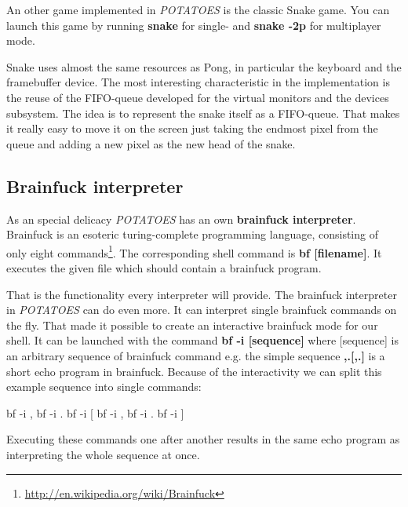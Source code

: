 \documentclass[11pt,a4paper]{scrartcl}
\makeatletter
\renewcommand*{\lstlistoflistings}{%
  \begingroup
    \if@twocolumn
      \@restonecoltrue\onecolumn
    \else
      \@restonecolfalse
    \fi
    \lol@heading
    \setlength{\parskip}{\z@}%
    \setlength{\parindent}{\z@}%
    \setlength{\parfillskip}{\z@ \@plus 1fil}%
    \@starttoc{lol}%
    \if@restonecol\twocolumn\fi
  \endgroup
}
\makeatother
\begin{document}
An other game implemented in \textit{POTATOES} is the classic Snake game. You can launch this game by running \textbf{snake} for single- and \textbf{snake -2p} for multiplayer mode.

Snake uses almost the same resources as Pong, in particular the keyboard and the framebuffer device. The most interesting characteristic in the implementation is the reuse of the FIFO-queue developed for the virtual monitors and the devices subsystem. The idea is to represent the snake itself as a FIFO-queue. That makes it really easy to move it on the screen just taking the endmost pixel from the queue and adding a new pixel as the new head of the snake.

\subsection{Brainfuck interpreter}

As an special delicacy \textit{POTATOES} has an own \textbf{brainfuck interpreter}. Brainfuck is an esoteric turing-complete programming language, consisting of only eight commands\footnote{\url{http://en.wikipedia.org/wiki/Brainfuck}}. The corresponding shell command is \textbf{bf [filename]}. It executes the given file which should contain a brainfuck program. 

That is the functionality every interpreter will provide. The brainfuck interpreter in \textit{POTATOES} can do even more. It can interpret single brainfuck commands on the fly. That made it possible to create an interactive brainfuck mode for our shell. It can be launched with the command \textbf{bf -i [sequence]} where [sequence] is an arbitrary sequence of brainfuck command e.g. the simple sequence \textbf{,.[,.]} is a short echo program in brainfuck.  Because of the interactivity we can split this example sequence into single commands:
\begin{code}[]
bf -i ,
bf -i .
bf -i [
bf -i ,
bf -i .
bf -i ]
\end{code}

Executing these commands one after another results in the same echo program as interpreting the whole sequence at once.

\pagebreak
\end{document}
